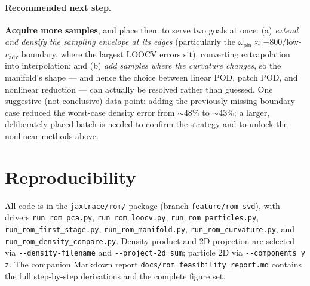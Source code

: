 \documentclass[11pt]{article}
\newcommand{\vadv}{v_{\mathrm{adv}}}
\newcommand{\opin}{\omega_{\mathrm{pin}}}
\begin{document}
\paragraph{Recommended next step.} \textbf{Acquire more samples}, and place
them to serve two goals at once: (a) \emph{extend and densify the sampling
envelope at its edges} (particularly the $\opin\approx-800$/low-$\vadv$
boundary, where the largest LOOCV errors sit), converting extrapolation
into interpolation; and (b) \emph{add samples where the curvature changes},
so the manifold's shape --- and hence the choice between linear POD, patch
POD, and nonlinear reduction --- can actually be resolved rather than
guessed. One suggestive (not conclusive) data point: adding the
previously-missing boundary case reduced the worst-case density error from
${\sim}48\%$ to ${\sim}43\%$; a larger, deliberately-placed batch is needed
to confirm the strategy and to unlock the nonlinear methods above.

\section*{Reproducibility}
All code is in the \texttt{jaxtrace/rom/} package (branch
\texttt{feature/rom-svd}), with drivers \texttt{run\_rom\_pca.py},
\texttt{run\_rom\_loocv.py}, \texttt{run\_rom\_particles.py},
\texttt{run\_rom\_first\_stage.py}, \texttt{run\_rom\_manifold.py},
\texttt{run\_rom\_curvature.py}, and
\texttt{run\_rom\_density\_compare.py}. Density product and 2D projection
are selected via \texttt{-{}-density-filename} and
\texttt{-{}-project-2d sum}; particle 2D via \texttt{-{}-components y z}.
The companion Markdown report \texttt{docs/rom\_feasibility\_report.md}
contains the full step-by-step derivations and the complete figure set.
\end{document}
